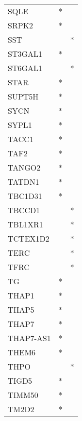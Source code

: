 \begin{longtable}{lcc}
SQLE             &              * &            \\
SRPK2            &              * &            \\
SST              &                &          * \\
ST3GAL1          &              * &            \\
ST6GAL1          &                &          * \\
STAR             &              * &            \\
SUPT5H           &              * &            \\
SYCN             &              * &            \\
SYPL1            &              * &            \\
TACC1            &              * &            \\
TAF2             &              * &            \\
TANGO2           &              * &            \\
TATDN1           &              * &            \\
TBC1D31          &              * &            \\
TBCCD1           &                &          * \\
TBL1XR1          &                &          * \\
TCTEX1D2         &                &          * \\
TERC             &                &          * \\
TFRC             &                &          * \\
TG               &              * &            \\
THAP1            &              * &            \\
THAP5            &              * &            \\
THAP7            &              * &            \\
THAP7-AS1        &              * &            \\
THEM6            &              * &            \\
THPO             &                &          * \\
TIGD5            &              * &            \\
TIMM50           &              * &            \\
TM2D2            &              * &            \\

\end{longtable}
